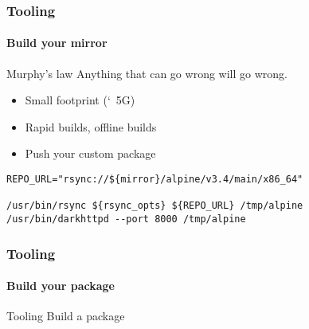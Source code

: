 \documentclass{beamer}
\begin{document}
\begin{frame}[fragile]
  \frametitle{Tooling}
  \framesubtitle{Build your mirror}

  \begin{block}{Murphy's law}
    Anything that can go wrong will go wrong.
  \end{block}

    \begin{itemize}
      \item Small footprint (\char`~5G)
      \item Rapid builds, offline builds
      \item Push your custom package
  \end{itemize}

  \begin{verbatim}
REPO_URL="rsync://${mirror}/alpine/v3.4/main/x86_64"

/usr/bin/rsync ${rsync_opts} ${REPO_URL} /tmp/alpine
/usr/bin/darkhttpd --port 8000 /tmp/alpine
  \end{verbatim}
\end{frame}

\begin{frame}
  \frametitle{Tooling}
  \framesubtitle{Build your package}

\end{frame}

\begin{frame}{Tooling}
  Build a package
\end{frame}
\end{document}
